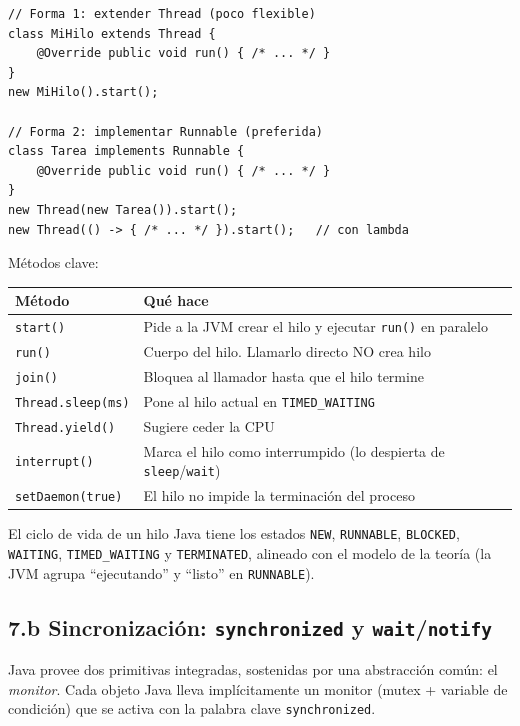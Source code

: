 \documentclass[11pt,a4paper]{article}
\begin{document}
\begin{lstlisting}[style=javastyle]
// Forma 1: extender Thread (poco flexible)
class MiHilo extends Thread {
    @Override public void run() { /* ... */ }
}
new MiHilo().start();

// Forma 2: implementar Runnable (preferida)
class Tarea implements Runnable {
    @Override public void run() { /* ... */ }
}
new Thread(new Tarea()).start();
new Thread(() -> { /* ... */ }).start();   // con lambda
\end{lstlisting}

Métodos clave:

\begin{center}
\small
\begin{tabular}{@{}lp{8.5cm}@{}}
\toprule
Método & Qué hace \\
\midrule
\texttt{start()}        & Pide a la JVM crear el hilo y ejecutar \texttt{run()} en paralelo \\
\texttt{run()}          & Cuerpo del hilo. Llamarlo directo NO crea hilo \\
\texttt{join()}         & Bloquea al llamador hasta que el hilo termine \\
\texttt{Thread.sleep(ms)} & Pone al hilo actual en \texttt{TIMED\_WAITING} \\
\texttt{Thread.yield()} & Sugiere ceder la CPU \\
\texttt{interrupt()}    & Marca el hilo como interrumpido (lo despierta de \texttt{sleep}/\texttt{wait}) \\
\texttt{setDaemon(true)} & El hilo no impide la terminación del proceso \\
\bottomrule
\end{tabular}
\end{center}

El ciclo de vida de un hilo Java tiene los estados \texttt{NEW},
\texttt{RUNNABLE}, \texttt{BLOCKED}, \texttt{WAITING},
\texttt{TIMED\_WAITING} y \texttt{TERMINATED}, alineado con el modelo
de la teoría (la JVM agrupa ``ejecutando'' y ``listo'' en
\texttt{RUNNABLE}).

\subsection*{7.b Sincronización: \texttt{synchronized} y \texttt{wait}/\texttt{notify}}

Java provee dos primitivas integradas, sostenidas por una abstracción
común: el \emph{monitor}. Cada objeto Java lleva implícitamente un
monitor (mutex + variable de condición) que se activa con la palabra
clave \texttt{synchronized}.
\end{document}
